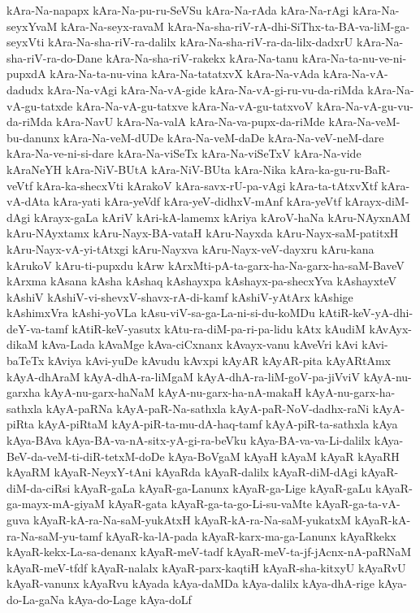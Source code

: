 {kAra-Na-napapx
kAra-Na-pu-ru-SeVSu
kAra-Na-rAda
kAra-Na-rAgi
kAra-Na-seyxYvaM
kAra-Na-seyx-ravaM
kAra-Na-sha-riV-rA-dhi-SiThx-ta-BA-va-liM-ga-seyxVti
kAra-Na-sha-riV-ra-dalilx
kAra-Na-sha-riV-ra-da-lilx-dadxrU
kAra-Na-sha-riV-ra-do-Dane
kAra-Na-sha-riV-rakekx
kAra-Na-tanu
kAra-Na-ta-nu-ve-ni-pupxdA
kAra-Na-ta-nu-vina
kAra-Na-tatatxvX
kAra-Na-vAda
kAra-Na-vA-dadudx
kAra-Na-vAgi
kAra-Na-vA-gide
kAra-Na-vA-gi-ru-vu-da-riMda
kAra-Na-vA-gu-tatxde
kAra-Na-vA-gu-tatxve
kAra-Na-vA-gu-tatxvoV
kAra-Na-vA-gu-vu-da-riMda
kAra-NavU
kAra-Na-valA
kAra-Na-va-pupx-da-riMde
kAra-Na-veM-bu-danunx
kAra-Na-veM-dUDe
kAra-Na-veM-daDe
kAra-Na-veV-neM-dare
kAra-Na-ve-ni-si-dare
kAra-Na-viSeTx
kAra-Na-viSeTxV
kAra-Na-vide
kAraNeYH
kAra-NiV-BUtA
kAra-NiV-BUta
kAra-Nika
kAra-ka-gu-ru-BaR-veVtf
kAra-ka-shecxVti
kArakoV
kAra-savx-rU-pa-vAgi
kAra-ta-tAtxvXtf
kAra-vA-dAta
kAra-yati
kAra-yeVdf
kAra-yeV-didhxV-mAnf
kAra-yeVtf
kArayx-diM-dAgi
kArayx-gaLa
kAriV
kAri-kA-lamemx
kAriya
kAroV-haNa
kAru-NAyxnAM
kAru-NAyxtamx
kAru-Nayx-BA-vataH
kAru-Nayxda
kAru-Nayx-saM-patitxH
kAru-Nayx-vA-yi-tAtxgi
kAru-Nayxva
kAru-Nayx-veV-dayxru
kAru-kana
kArukoV
kAru-ti-pupxdu
kArw
kArxMti-pA-ta-garx-ha-Na-garx-ha-saM-BaveV
kArxma
kAsana
kAsha
kAshaq
kAshayxpa
kAshayx-pa-shecxYva
kAshayxteV
kAshiV
kAshiV-vi-shevxV-shavx-rA-di-kamf
kAshiV-yAtArx
kAshige
kAshimxVra
kAshi-yoVLa
kAsu-viV-sa-ga-La-ni-si-du-koMDu
kAtiR-keV-yA-dhi-deY-va-tamf
kAtiR-keV-yasutx
kAtu-ra-diM-pa-ri-pa-lidu
kAtx
kAudiM
kAvAyx-dikaM
kAva-Lada
kAvaMge
kAva-ciCxnanx
kAvayx-vanu
kAveVri
kAvi
kAvi-baTeTx
kAviya
kAvi-yuDe
kAvudu
kAvxpi
kAyAR
kAyAR-pita
kAyARtAmx
kAyA-dhAraM
kAyA-dhA-ra-liMgaM
kAyA-dhA-ra-liM-goV-pa-jiVviV
kAyA-nu-garxha
kAyA-nu-garx-haNaM
kAyA-nu-garx-ha-nA-makaH
kAyA-nu-garx-ha-sathxla
kAyA-paRNa
kAyA-paR-Na-sathxla
kAyA-paR-NoV-dadhx-raNi
kAyA-piRta
kAyA-piRtaM
kAyA-piR-ta-mu-dA-haq-tamf
kAyA-piR-ta-sathxla
kAya
kAya-BAva
kAya-BA-va-nA-sitx-yA-gi-ra-beVku
kAya-BA-va-va-Li-dalilx
kAya-BeV-da-veM-ti-diR-tetxM-doDe
kAya-BoVgaM
kAyaH
kAyaM
kAyaR
kAyaRH
kAyaRM
kAyaR-NeyxY-tAni
kAyaRda
kAyaR-dalilx
kAyaR-diM-dAgi
kAyaR-diM-da-ciRsi
kAyaR-gaLa
kAyaR-ga-Lanunx
kAyaR-ga-Lige
kAyaR-gaLu
kAyaR-ga-mayx-mA-giyaM
kAyaR-gata
kAyaR-ga-ta-go-Li-su-vaMte
kAyaR-ga-ta-vA-guva
kAyaR-kA-ra-Na-saM-yukAtxH
kAyaR-kA-ra-Na-saM-yukatxM
kAyaR-kA-ra-Na-saM-yu-tamf
kAyaR-ka-lA-pada
kAyaR-karx-ma-ga-Lanunx
kAyaRkekx
kAyaR-kekx-La-sa-denanx
kAyaR-meV-tadf
kAyaR-meV-ta-jf-jAcnx-nA-paRNaM
kAyaR-meV-tfdf
kAyaR-nalalx
kAyaR-parx-kaqtiH
kAyaR-sha-kitxyU
kAyaRvU
kAyaR-vanunx
kAyaRvu
kAyada
kAya-daMDa
kAya-dalilx
kAya-dhA-rige
kAya-do-La-gaNa
kAya-do-Lage
kAya-doLf
}
